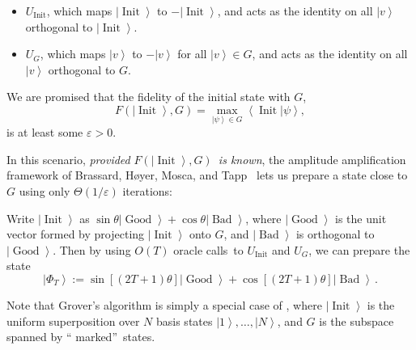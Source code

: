 \begin{itemize}
\item $U_{\operatorname*{Init}}$, which maps $\left\vert \operatorname*{Init}%
\right\rangle $ to $-\left\vert \operatorname*{Init}\right\rangle $, and acts
as the identity on all $\left\vert v\right\rangle $ orthogonal to $\left\vert
\operatorname*{Init}\right\rangle $.

\item $U_{G}$, which maps $\left\vert v\right\rangle $ to $-\left\vert
v\right\rangle $ for all $\left\vert v\right\rangle \in G$, and acts as the
identity on all $\left\vert v\right\rangle $ orthogonal to $G$.
\end{itemize}

We are promised that the fidelity of the initial state with $G$,%
\[
F\left(  \left\vert \operatorname*{Init}\right\rangle ,G\right)
=\max_{\left\vert \psi\right\rangle \in G}\left\langle \operatorname*{Init}%
|\psi\right\rangle ,
\]
is at least some $\varepsilon>0$.

In this scenario, \emph{provided }$F\left(  \left\vert \operatorname*{Init}%
\right\rangle ,G\right)  $\emph{\ is known}, the amplitude amplification
framework of Brassard, H\o yer, Mosca, and Tapp~\cite{bhmt} lets us prepare a
state close to $G$ using only $\Theta(1/\varepsilon)$ iterations:

\begin{lemma}
\label{aa}Write $\left\vert
\operatorname*{Init}\right\rangle $ as $\sin\theta\left\vert
\operatorname*{Good}\right\rangle +\cos\theta\left\vert \operatorname*{Bad}%
\right\rangle $, where $\left\vert \operatorname*{Good}\right\rangle $ is the
unit vector formed by projecting $\left\vert \operatorname*{Init}\right\rangle
$ onto $G$, and $\left\vert \operatorname*{Bad}\right\rangle $ is orthogonal
to $\left\vert \operatorname*{Good}\right\rangle $. Then by using $O\left(
T\right)  $ oracle calls\ to $U_{\operatorname*{Init}}$ and $U_{G}$, we can
prepare the state%
\[
\left\vert \Phi_{T}\right\rangle :=\sin\left[  \left(  2T+1\right)
\theta\right]  \left\vert \operatorname*{Good}\right\rangle +\cos\left[
\left(  2T+1\right)  \theta\right]  \left\vert \operatorname*{Bad}%
\right\rangle\,.
\]

\end{lemma}

Note that Grover's algorithm is simply a special case of , where
$\left\vert \operatorname*{Init}\right\rangle $ is the uniform superposition
over $N$ basis states $\left\vert 1\right\rangle ,\ldots,\left\vert
N\right\rangle $, and $G$ is the subspace spanned by \textquotedblleft
marked\textquotedblright\ states.

